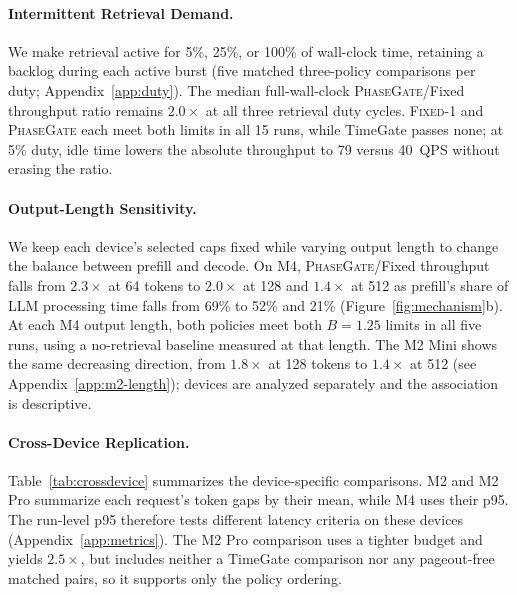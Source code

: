 \documentclass{article}
\newcommand{\system}{\textsc{PhaseGate}\xspace}
\newcommand{\fixed}[1]{\textsc{Fixed}-#1}
\begin{document}
\paragraph{Intermittent Retrieval Demand.}
We make retrieval active for 5\%, 25\%, or 100\% of wall-clock time, retaining a backlog during each active burst (five matched three-policy comparisons per duty; Appendix~\ref{app:duty}).
The median full-wall-clock \system/Fixed throughput ratio remains $2.0\times$ at all three retrieval duty cycles.
\fixed{1} and \system each meet both limits in all 15 runs, while TimeGate passes none; at 5\% duty, idle time lowers the absolute throughput to 79 versus 40~QPS without erasing the ratio.

\paragraph{Output-Length Sensitivity.}
We keep each device's selected caps fixed while varying output length to change the balance between prefill and decode.
On M4, \system/Fixed throughput falls from $2.3\times$ at 64 tokens to $2.0\times$ at 128 and $1.4\times$ at 512 as prefill's share of LLM processing time falls from 69\% to 52\% and 21\% (Figure~\ref{fig:mechanism}b).
At each M4 output length, both policies meet both $B=1.25$ limits in all five runs, using a no-retrieval baseline measured at that length.
The M2 Mini shows the same decreasing direction, from $1.8\times$ at 128 tokens to $1.4\times$ at 512 (see Appendix~\ref{app:m2-length}); devices are analyzed separately and the association is descriptive.

\paragraph{Cross-Device Replication.}
Table~\ref{tab:crossdevice} summarizes the device-specific comparisons.
M2 and M2 Pro summarize each request's token gaps by their mean, while M4 uses their p95.
The run-level p95 therefore tests different latency criteria on these devices (Appendix~\ref{app:metrics}).
The M2 Pro comparison uses a tighter budget and yields $2.5\times$, but includes neither a TimeGate comparison nor any pageout-free matched pairs, so it supports only the policy ordering.
\end{document}
